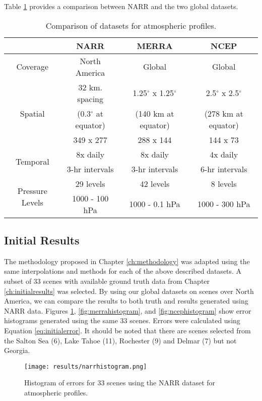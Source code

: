 \documentclass{book}
\begin{document}
Table \ref{tab:datasets} provides a comparison between NARR and the two global datasets.

\begin{table}[H]
\begin{center}
\begin{tabular}{|c | c | c | c |}
\hline
 & NARR & MERRA & NCEP \\ \hline
Coverage & North America & Global & Global \\ \hline
\multirow{3}{*}{Spatial} & 32 km. spacing & 1.25$^\circ$ x 1.25$^\circ$ & 2.5$^\circ$ x 2.5$^\circ$ \\
 & (0.3$^\circ$ at equator) & (140 km at equator) & (278 km at equator) \\
 & 349 x 277 & 288 x 144 & 144 x 73 \\ \hline
 \multirow{2}{*}{Temporal} & 8x daily & 8x daily & 4x daily \\
  & 3-hr intervals & 3-hr intervals & 6-hr intervals \\ \hline
 \multirow{2}{*}{Pressure Levels} & 29 levels & 42 levels & 8 levels \\
  & 1000 - 100 hPa & 1000 - 0.1 hPa & 1000 - 300 hPa \\ \hline
\end{tabular}
\caption{Comparison of datasets for atmospheric profiles.}
\label{tab:datasets}
\end{center}
\end{table}

\subsection{Initial Results}

The methodology proposed in Chapter \ref{ch:methodology} was adapted using the same interpolations and methods for each of the above described datasets.  A subset of 33 scenes with available ground truth data from Chapter \ref{ch:initialresults} was selected.  By using our global datasets on scenes over North America, we can compare the results to both truth and results generated using NARR data.  Figures \ref{fig:narrhistogram}, \ref{fig:merrahistogram}, and \ref{fig:ncephistogram} show error histograms generated using the same 33 scenes.  Errors were calculated using Equation \ref{eq:initialerror}.  It should be noted that there are scenes selected from the Salton Sea (6), Lake Tahoe (11), Rochester (9) and Delmar (7) but not Georgia.

\begin{figure}[H]
\centering
\texttt{[image: results/narrhistogram.png]}
\caption{Histogram of errors for 33 scenes using the NARR dataset for atmospheric profiles.}
\label{fig:narrhistogram}
\end{figure}
\end{document}
